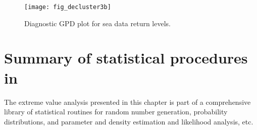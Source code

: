 \begin{figure}[t]
\centerline{
\texttt{[image: fig\_decluster3b]}}
\vspace{-3mm}
\caption[Diagnostic POT plot for sea data]{Diagnostic GPD plot for sea
data return levels.}
\label{fig:decluster3}
\end{figure}


\clearpage
\section{Summary of statistical procedures in \progname{}}
\label{sec:extremevaluestatistics}

The extreme value analysis presented in this chapter is part of a
comprehensive library of statistical routines for
random number generation, probability distributions, and parameter and density
estimation and likelihood analysis, etc.
